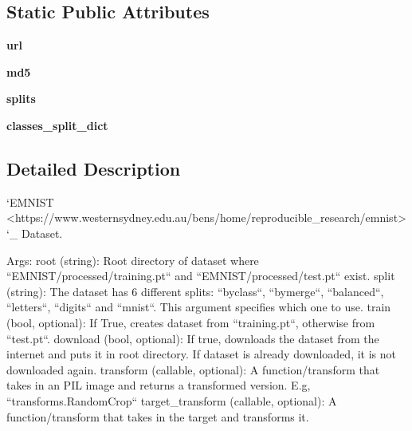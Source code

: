 \subsection*{Static Public Attributes}
\begin{DoxyCompactItemize}
\item 
\mbox{\label{classtorchvision_1_1datasets_1_1mnist_1_1EMNIST_aa5d7f086836dcdbcfce281930e37c9ce}} 
{\bfseries url}
\item 
\mbox{\label{classtorchvision_1_1datasets_1_1mnist_1_1EMNIST_aabf912b8ec2acf3d62d843d2e88bec7a}} 
{\bfseries md5}
\item 
\mbox{\label{classtorchvision_1_1datasets_1_1mnist_1_1EMNIST_a93e35ee64eebe41531f89a536d141395}} 
{\bfseries splits}
\item 
\mbox{\label{classtorchvision_1_1datasets_1_1mnist_1_1EMNIST_a998882b70c6109be4b317a00fd18f005}} 
{\bfseries classes\+\_\+split\+\_\+dict}
\end{DoxyCompactItemize}


\subsection{Detailed Description}
\begin{DoxyVerb}`EMNIST <https://www.westernsydney.edu.au/bens/home/reproducible_research/emnist>`_ Dataset.

Args:
    root (string): Root directory of dataset where ``EMNIST/processed/training.pt``
        and  ``EMNIST/processed/test.pt`` exist.
    split (string): The dataset has 6 different splits: ``byclass``, ``bymerge``,
        ``balanced``, ``letters``, ``digits`` and ``mnist``. This argument specifies
        which one to use.
    train (bool, optional): If True, creates dataset from ``training.pt``,
        otherwise from ``test.pt``.
    download (bool, optional): If true, downloads the dataset from the internet and
        puts it in root directory. If dataset is already downloaded, it is not
        downloaded again.
    transform (callable, optional): A function/transform that  takes in an PIL image
        and returns a transformed version. E.g, ``transforms.RandomCrop``
    target_transform (callable, optional): A function/transform that takes in the
        target and transforms it.
\end{DoxyVerb}
 

